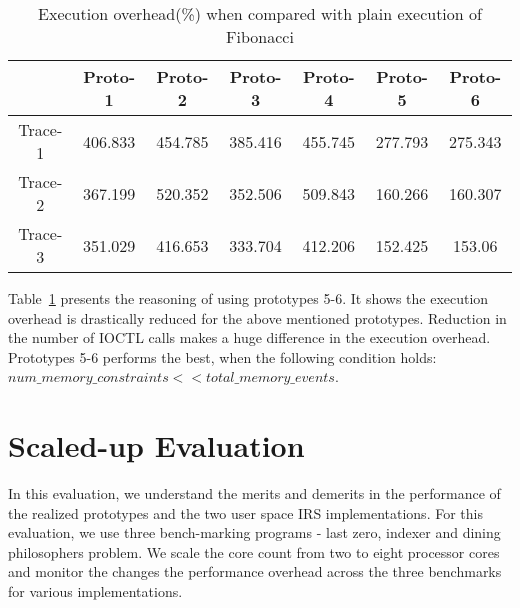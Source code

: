 \begin{table}[!h]
\begin{center}
 \begin{tabular}{|c c c c c c c|} 
 \hline
 & Proto-1 & Proto-2 & Proto-3 & Proto-4 & Proto-5 & Proto-6\\ %
 \hline
 Trace-1 & 406.833 & 454.785 & 385.416 & 455.745 & 277.793 & 275.343 \\ 
 Trace-2 & 367.199 & 520.352 & 352.506 & 509.843 & 160.266 & 160.307 \\
 Trace-3 & 351.029 & 416.653 & 333.704 & 412.206 & 152.425 & 153.06\\
 \hline
\end{tabular}
\end{center}
\caption{Execution overhead(\%) when compared with plain execution of Fibonacci}
\label{fib_exec_over}
\end{table}

Table~\ref{fib_exec_over} presents the reasoning of using prototypes 5-6. 
It shows the execution overhead is drastically reduced for the above mentioned prototypes. 
Reduction in the number of IOCTL calls makes a huge difference in the execution overhead. 
Prototypes 5-6 performs the best, when the following condition holds:
$num\_memory\_constraints << total\_memory\_events$.
\section{Scaled-up Evaluation}

In this evaluation, we understand the merits and demerits in the performance of the realized prototypes and the two user space IRS implementations. 
For this evaluation, we use three bench-marking programs - last zero, indexer and dining philosophers problem. 
We scale the core count from two to eight processor cores and monitor the changes the performance overhead across the three benchmarks for various implementations. 
